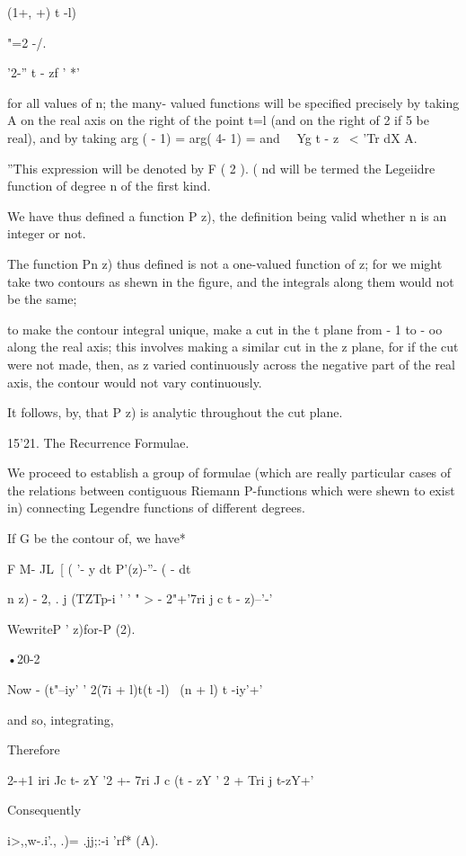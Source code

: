 {(1+, +) t -l)

"=2 -/.

  '2-'' t - zf ' *'

for all values of n; the many- valued functions will be specified
precisely by taking A on the real axis on the right of the point t=l
(and on the right of 2 if 5 be real), and by taking arg ( - 1) = arg(
4- 1) = and \ \ Yg t - z \ < 'Tr dX A.

''This expression will be denoted by F ( 2 ). ( nd will be termed the
Legeiidre function of degree n of the first kind.

We have thus defined a function P z), the definition being valid
whether n is an integer or not.

The function Pn z) thus defined is not a one-valued function of z;
for we might take two contours as shewn in the figure, and the
integrals along them would not be the same;

to make the contour integral unique, make a cut in the t plane from -
1 to - oo along the real axis; this involves making a similar cut in
the z plane, for if the cut were not made, then, as z varied
continuously across the negative part of the real axis, the contour
would not vary continuously.

It follows, by, that P z) is analytic throughout the cut plane.

15'21. The Recurrence Formulae.

We proceed to establish a group of formulae (which are really
particular cases of the relations between contiguous Riemann
P-functions which were shewn to exist in) connecting Legendre
functions of different degrees.

If G be the contour of, we have*

F M- JL\ [ ( '- y dt P'(z)-''- ( - dt

 n z) - 2, . j (TZTp-i ' ' " > - 2"+'7ri j c t - z)--'-'

WewriteP ' z)for-P (2).

•20-2

%
%

Now - (t"--iy' ' 2(7i + l)t(t -l) \ (n + l) t -iy'+'

and so, integrating,

Therefore

2-+1 iri Jc t- zY '2 +- 7ri J c (t - zY ' 2 + Tri j t-zY+'

Consequently

i>,,w-.i'., .)= .jj;:-i 'rf* (A).

}
